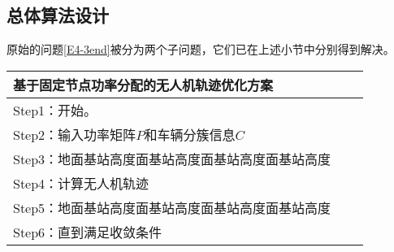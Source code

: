 \subsection{总体算法设计}\label{section4-4}
原始的问题\eqref{E4-3end}被分为两个子问题，它们已在上述小节中分别得到解决。
\begin{comment}
\begin{table}[htbp!]
 \centering\small
\begin{tabular*}{\hsize}{@{\extracolsep{\fill}}c c c c}
 \toprule
 &&基于固定节点功率分配的无人机轨迹优化方案                   \\
 \midrule
 &&Step1：开始。                \\
 &&Step2：输入功率矩阵$P$和车辆分簇信息$C$               \\
 &&Step2：地面基站高度面基站高度面基站高度面基站高度                         \\
 \bottomrule
 \end{tabular*}
\end{table}

\begin{tabular}{lcr}
    \toprule
    Item  &amp; Quantity &amp; Price (\$) \\
    \midrule
    Apple &amp; 2        &amp; 1.50       \\
    Banana &amp; 3       &amp; 1.00       \\
    Cherry &amp; 5       &amp; 0.50       \\
    \bottomrule
\end{tabular}
\end{comment}

\begin{tabular}{lcr}
    \toprule
    基于固定节点功率分配的无人机轨迹优化方案           \\
    \midrule
    Step1：开始。                                      \\
    Step2：输入功率矩阵$P$和车辆分簇信息$C$            \\
    Step3：地面基站高度面基站高度面基站高度面基站高度  \\
    Step4：计算无人机轨迹                              \\
    Step5：地面基站高度面基站高度面基站高度面基站高度  \\
    Step6：直到满足收敛条件                            \\
    \bottomrule
\end{tabular}


